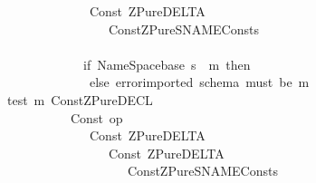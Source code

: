 \begin{isabellebody}
\ \ \ \ \ \ \ \ \ \ \ \ \ \ \ \ \ \ \ \ \ \ \ \ \ \ {\isachardollar}\ {\isacharparenleft}Const\ {\isacharparenleft}{\isachardoublequote}ZPure{\isachardot}DELTA{\isachardoublequote}{\isacharcomma}{\isacharunderscore}{\isacharparenright}\ \isanewline
\ \ \ \ \ \ \ \ \ \ \ \ \ \ \ \ \ \ \ \ \ \ \ \ \ \ \ \ \ {\isachardollar}\ {\isacharparenleft}Const{\isacharparenleft}{\isachardoublequote}ZPure{\isachardot}SNAME{\isachardoublequote}{\isacharcomma}{\isacharunderscore}{\isacharparenright}{\isachardollar}{\isacharparenleft}Const{\isacharparenleft}s{\isacharcomma}{\isacharunderscore}{\isacharparenright}{\isacharparenright}{\isachardollar}{\isacharunderscore}{\isacharparenright}\ \isanewline
\ \ \ \ \ \ \ \ \ \ \ \ \ \ \ \ \ \ \ \ \ \ \ \ \ \ \ \ \ {\isachardollar}\ {\isacharunderscore}{\isacharparenright}\isanewline
\ \ \ \ \ \ \ \ \ \ \ \ \ \ \ \ \ \ \ \ \ \ \ \ \ \ {\isachardollar}\ {\isacharunderscore}{\isacharparenright}\ {\isachardollar}\ {\isacharunderscore}{\isacharparenright}\ {\isacharequal}\ \isanewline
\ \ \ \ \ \ \ \ \ \ \ \ \ \ \ \ \ \ \ \ \ \ \ \ \ \ {\isacharparenleft}if\ {\isacharparenleft}NameSpace{\isachardot}base\ s{\isacharparenright}\ {\isacharequal}\ m\ then\ {\isacharparenleft}{\isacharparenright}\isanewline
\ \ \ \ \ \ \ \ \ \ \ \ \ \ \ \ \ \ \ \ \ \ \ \ \ \ \ else\ error{\isacharparenleft}{\isachardoublequote}imported\ schema\ must\ be\ {\isacharcolon}{\isachardoublequote}{\isacharcircum}m{\isacharparenright}{\isacharparenright}\isanewline
\ \ \ \ \ \ \ \ \ \ \ \ \ \ {\isacharbar}test\ m\ {\isacharparenleft}Const{\isacharparenleft}{\isachardoublequote}ZPure{\isachardot}DECL{\isachardoublequote}{\isacharcomma}{\isacharunderscore}{\isacharparenright}\ {\isachardollar}\isanewline
\ \ \ \ \ \ \ \ \ \ \ \ \ \ \ \ \ \ \ \ \ \ \ \ {\isacharparenleft}Const\ {\isacharparenleft}{\isachardoublequote}op\ {\isacharampersand}{\isachardoublequote}{\isacharcomma}{\isacharunderscore}{\isacharparenright}\ \ \isanewline
\ \ \ \ \ \ \ \ \ \ \ \ \ \ \ \ \ \ \ \ \ \ \ \ \ \ {\isachardollar}\ {\isacharparenleft}Const\ {\isacharparenleft}{\isachardoublequote}ZPure{\isachardot}DELTA{\isachardoublequote}{\isacharcomma}{\isacharunderscore}{\isacharparenright}\isanewline
\ \ \ \ \ \ \ \ \ \ \ \ \ \ \ \ \ \ \ \ \ \ \ \ \ \ \ \ \ {\isachardollar}\ {\isacharparenleft}Const\ {\isacharparenleft}{\isachardoublequote}ZPure{\isachardot}DELTA{\isachardoublequote}{\isacharcomma}{\isacharunderscore}{\isacharparenright}\ \isanewline
\ \ \ \ \ \ \ \ \ \ \ \ \ \ \ \ \ \ \ \ \ \ \ \ \ \ \ \ \ \ \ \ {\isachardollar}\ {\isacharparenleft}Const{\isacharparenleft}{\isachardoublequote}ZPure{\isachardot}SNAME{\isachardoublequote}{\isacharcomma}{\isacharunderscore}{\isacharparenright}{\isachardollar}{\isacharparenleft}Const{\isacharparenleft}s{\isacharcomma}{\isacharunderscore}{\isacharparenright}{\isacharparenright}{\isachardollar}{\isacharunderscore}{\isacharparenright}\ \isanewline

\end{isabellebody}

